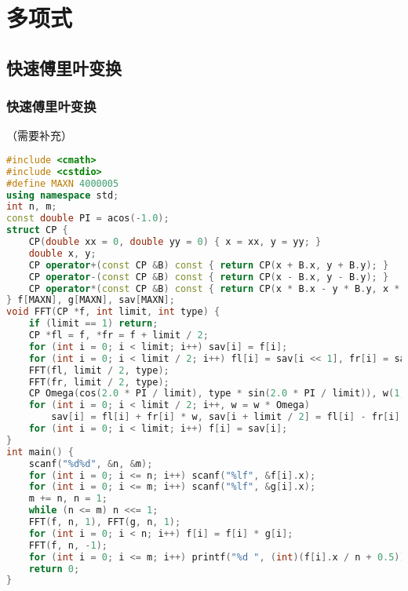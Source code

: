 \documentclass[9pt, a4paper, oneside]{book}
\begin{document}
\section{多项式}
\subsection{快速傅里叶变换}
\subsubsection{快速傅里叶变换}
（需要补充）
\begin{lstlisting}[language={C++}]
#include <cmath>
#include <cstdio>
#define MAXN 4000005
using namespace std;
int n, m;
const double PI = acos(-1.0);
struct CP {
    CP(double xx = 0, double yy = 0) { x = xx, y = yy; }
    double x, y;
    CP operator+(const CP &B) const { return CP(x + B.x, y + B.y); }
    CP operator-(const CP &B) const { return CP(x - B.x, y - B.y); }
    CP operator*(const CP &B) const { return CP(x * B.x - y * B.y, x * B.y + y * B.x); }
} f[MAXN], g[MAXN], sav[MAXN];
void FFT(CP *f, int limit, int type) {
    if (limit == 1) return;
    CP *fl = f, *fr = f + limit / 2;
    for (int i = 0; i < limit; i++) sav[i] = f[i];
    for (int i = 0; i < limit / 2; i++) fl[i] = sav[i << 1], fr[i] = sav[i << 1 | 1];
    FFT(fl, limit / 2, type);
    FFT(fr, limit / 2, type);
    CP Omega(cos(2.0 * PI / limit), type * sin(2.0 * PI / limit)), w(1, 0);
    for (int i = 0; i < limit / 2; i++, w = w * Omega)
        sav[i] = fl[i] + fr[i] * w, sav[i + limit / 2] = fl[i] - fr[i] * w;
    for (int i = 0; i < limit; i++) f[i] = sav[i];
}
int main() {
    scanf("%d%d", &n, &m);
    for (int i = 0; i <= n; i++) scanf("%lf", &f[i].x);
    for (int i = 0; i <= m; i++) scanf("%lf", &g[i].x);
    m += n, n = 1;
    while (n <= m) n <<= 1;
    FFT(f, n, 1), FFT(g, n, 1);
    for (int i = 0; i < n; i++) f[i] = f[i] * g[i];
    FFT(f, n, -1);
    for (int i = 0; i <= m; i++) printf("%d ", (int)(f[i].x / n + 0.5));
    return 0;
}\end{lstlisting}
\end{document}
